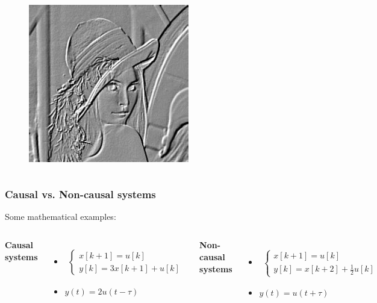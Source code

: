 \begin{frame}
\begin{columns}
		\begin{figure}
			\includegraphics[width=.5\linewidth]{highlight}
		\end{figure}
		\vspace{-4ex}
		
	\end{columns}
\end{frame}

\begin{frame}
	\frametitle{Causal vs. Non-causal systems}
	\vspace{-6ex}
	Some mathematical examples:\\
	\bigskip
	\begin{columns}
		\textbf{Causal systems}\\
		\begin{itemize}
			\item \begin{align*}
				\begin{cases}
					x[k+1] = u[k]\\
					y[k] = 3 x [k+1] + u[k]
				\end{cases}
			\end{align*}
			\item $y(t) = 2 u(t-\tau)$
		\end{itemize}
		
		\textbf{Non-causal systems}\\
		\begin{itemize}
			\item \begin{align*}
				\begin{cases}
					x[k+1] = u[k]\\
					y[k] = x[k+2] + \frac{1}{2}u[k]
				\end{cases}
			\end{align*}
			\item $y(t) = u(t + \tau)$
		\end{itemize}
		
	\end{columns}
\end{frame}

